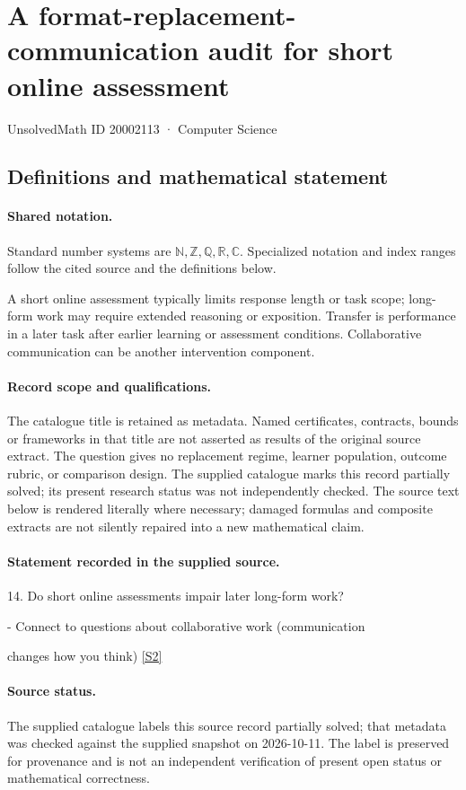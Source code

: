 \documentclass[11pt]{article}
\newcommand{\sref}[2]{\hyperlink{source:#1:#2}{[S#2]}}
\begin{document}
\setcounter{section}{20002112}
\section{A format-replacement-communication audit for short online assessment}\label{20002113}
{\small\sffamily UnsolvedMath ID 20002113 · Computer Science}
\subsection{Definitions and mathematical statement}

\paragraph{Shared notation.}Standard number systems are $\mathbb N,\mathbb Z,\mathbb Q,\mathbb R,\mathbb C$. Specialized notation and index ranges follow the cited source and the definitions below.


A short online assessment typically limits response length or task scope; long-form work may require extended reasoning or exposition. Transfer is performance in a later task after earlier learning or assessment conditions. Collaborative communication can be another intervention component.
\paragraph{Record scope and qualifications.}
The catalogue title is retained as metadata. Named certificates, contracts, bounds or frameworks in that title are not asserted as results of the original source extract.
The question gives no replacement regime, learner population, outcome rubric, or comparison design. The supplied catalogue marks this record partially solved; its present research status was not independently checked.
The source text below is rendered literally where necessary; damaged formulas and composite extracts are not silently repaired into a new mathematical claim.
\paragraph{Statement recorded in the supplied source.}
14. Do short online assessments impair later long-form work?

- Connect to questions about collaborative work (communication

changes how you think) \sref{20002113}{2}
\paragraph{Source status.}
The supplied catalogue labels this source record partially solved; that metadata was checked against the supplied snapshot on 2026-10-11. The label is preserved for provenance and is not an independent verification of present open status or mathematical correctness.
\end{document}
